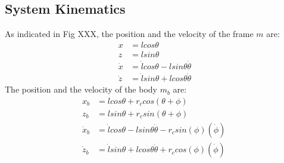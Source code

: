\subsection{System Kinematics}
As indicated in Fig XXX, the position 
and the velocity of the frame $m$ are:
\begin{align*}
x &= lcos\theta \\
z &= lsin\theta \\
	\dot x &= \dot lcos\theta -lsin\theta\dot \theta \\
\dot z &= \dot lsin\theta + lcos\theta \dot{\theta}
\end{align*}
The position 
and the velocity of the body $m_b$ are:
\begin{align*}
x_b &= lcos\theta + r_ccos(\theta +\phi)\\
z_b &= lsin\theta + r_csin(\theta +\phi)\\
\dot x_b &= \dot lcos\theta -lsin\theta\dot \theta -  r_csin(\phi)(\dot\phi)\\
\dot z_b &= \dot lsin\theta + lcos\theta \dot{\theta}+ r_ccos(\phi)(\dot\phi)\
\end{align*}





